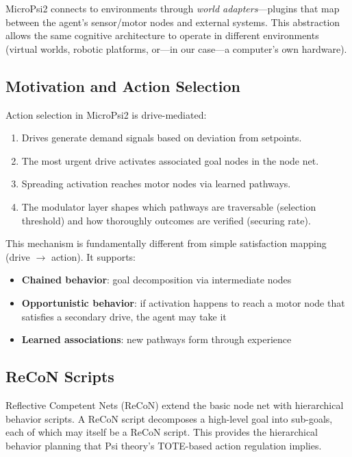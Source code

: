 \documentclass[11pt,letterpaper]{article}
\begin{document}
MicroPsi2 connects to environments through \emph{world adapters}---plugins
that map between the agent's sensor/motor nodes and external systems. This
abstraction allows the same cognitive architecture to operate in different
environments (virtual worlds, robotic platforms, or---in our case---a
computer's own hardware).

\subsection{Motivation and Action Selection}

Action selection in MicroPsi2 is drive-mediated:
\begin{enumerate}
  \item Drives generate demand signals based on deviation from setpoints.
  \item The most urgent drive activates associated goal nodes in the node
    net.
  \item Spreading activation reaches motor nodes via learned pathways.
  \item The modulator layer shapes which pathways are traversable (selection
    threshold) and how thoroughly outcomes are verified (securing rate).
\end{enumerate}

This mechanism is fundamentally different from simple satisfaction mapping
(drive $\rightarrow$ action). It supports:
\begin{itemize}
  \item \textbf{Chained behavior}: goal decomposition via intermediate nodes
  \item \textbf{Opportunistic behavior}: if activation happens to reach a
    motor node that satisfies a secondary drive, the agent may take it
  \item \textbf{Learned associations}: new pathways form through
    experience
\end{itemize}

\subsection{ReCoN Scripts}

Reflective Competent Nets (ReCoN) extend the basic node net with
hierarchical behavior scripts. A ReCoN script decomposes a high-level goal
into sub-goals, each of which may itself be a ReCoN script. This provides
the hierarchical behavior planning that Psi theory's TOTE-based action
regulation implies.
\end{document}
